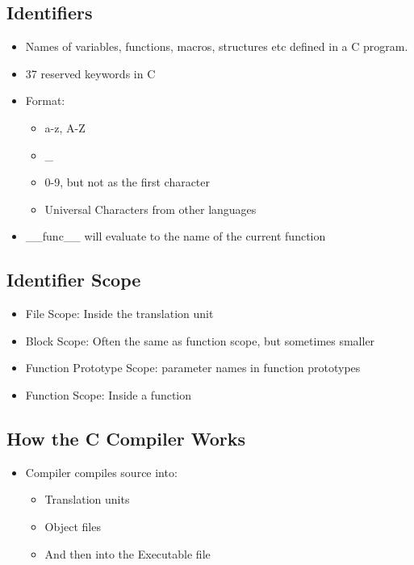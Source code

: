 \documentclass[a4wide,10pt]{article}
\begin{document}
		\subsection{Identifiers} %
		\label{sub:identifiers}
			\begin{itemize}
				\item Names of variables, functions, macros, structures etc defined in a C program.
				\item 37 reserved keywords in C
				\item Format:
					\begin{itemize}
						\item a-z, A-Z
						\item \_
						\item 0-9, but not as the first character
						\item Universal Characters from other languages
					\end{itemize}
				\item \_\_func\_\_ will evaluate to the name of the current function
			\end{itemize}
		
		\subsection{Identifier Scope} %
		\label{sub:identifier_scope}
			\begin{itemize}
				\item File Scope: Inside the translation unit
				\item Block Scope: Often the same as function scope, but sometimes smaller
				\item Function Prototype Scope: parameter names in function prototypes
				\item Function Scope: Inside a function
			\end{itemize}
		
		\subsection{How the C Compiler Works} %
		\label{sub:how_the_c_compiler_works}
			\begin{itemize}
				\item Compiler compiles source into:
					\begin{itemize}
						\item Translation units
						\item Object files
						\item And then into the Executable file
					\end{itemize}
			\end{itemize}
\end{document}
